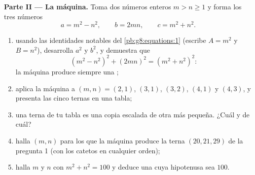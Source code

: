\begin{problem}[{Problema de fin de semana --- triángulos rectángulos de lados enteros
y la identidad $(m^2 - n^2)^2 + (2mn)^2 = (m^2 + n^2)^2$ que
las genera todas}]
\medskip
\noindent\textbf{Parte II --- La máquina.}
Toma dos números enteros $m > n \geq 1$ y forma los tres números
\[
a = m^2 - n^2,
\qquad
b = 2mn,
\qquad
c = m^2 + n^2 .
\]
\begin{enumerate}[resume]
  \item usando las identidades notables del
        \cref{pb:g8:equations:1} (escribe $A = m^2$ y $B = n^2$),
        desarrolla $a^2$ y $b^2$, y demuestra que
        \[
        \left(m^2 - n^2\right)^2 + (2mn)^2
        = \left(m^2 + n^2\right)^2 :
        \]
        la máquina produce siempre una ;
  \item aplica la máquina a $(m, n) = (2, 1)$, $(3, 1)$, $(3, 2)$,
        $(4, 1)$ y $(4, 3)$, y presenta las cinco ternas en una
        tabla;
  \item una terna de tu tabla es una copia escalada de otra más
        pequeña. ¿Cuál y de cuál?
  \item halla $(m, n)$ para los que la máquina produce la terna
        $(20, 21, 29)$ de la pregunta 1 (con los catetos en cualquier orden);
  \item halla $m$ y $n$ con $m^2 + n^2 = 100$ y deduce una
         cuya hipotenusa sea $100$.
\end{enumerate}


\end{problem}
